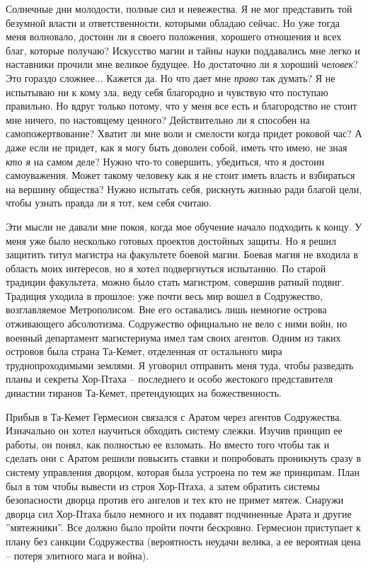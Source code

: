 \documentclass[12pt,a4paper]{article}
\begin{document}
Солнечные дни молодости, полные сил и невежества. Я не мог представить той безумной власти и ответственности, которыми обладаю сейчас.
Но уже тогда меня волновало, достоин ли я своего положения, хорошего отношения и всех благ, которые получаю?
Искусство магии и тайны науки поддавались мне легко и наставники прочили мне великое будущее. Но достаточно ли я хороший \textit{человек}? Это гораздо сложнее... Кажется да. Но что дает мне \textit{право} так думать?
Я не испытываю ни к кому зла, веду себя благородно и чувствую что поступаю правильно. Но вдруг только потому, что у меня все есть и благородство не стоит мне ничего, по настоящему ценного?
Действительно ли я способен на самопожертвование?
Хватит ли мне воли и смелости когда придет роковой час?
А даже если не придет, как я могу быть доволен собой, иметь что имею, не зная \textit{кто я} на самом деле?
Нужно что-то совершить, убедиться, что я достоин самоуважения.
Может такому человеку как я не стоит иметь власть и взбираться на вершину общества?
Нужно испытать себя, рискнуть жизнью ради благой цели, чтобы узнать правда ли я тот, кем себя считаю.

Эти мысли не давали мне покоя, когда мое обучение начало подходить к концу. У меня уже было несколько готовых проектов достойных защиты. Но я решил защитить титул магистра на факультете боевой магии. Боевая магия не входила в область моих интересов, но я хотел подвергнуться испытанию.
По старой традиции факультета, можно было стать магистром, совершив ратный подвиг.
Традиция уходила в прошлое: уже почти весь мир вошел в Содружество, возглавляемое Метрополисом. Вне его оставались лишь немногие острова отживающего абсолютизма. Содружество официально не вело с ними войн, но военный департамент магистериума имел там своих агентов. Одним из таких островов была страна Та-Кемет, отделенная от остального мира труднопроходимыми землями. Я уговорил отправить меня туда, чтобы разведать планы и секреты Хор-Птаха -- последнего и особо жестокого представителя династии тиранов Та-Кемет, претендующих на божественность.


Прибыв в Та-Кемет Гермесион связался с Аратом через агентов Содружества. Изначально он хотел научиться обходить систему слежки. Изучив принцип ее работы, он понял, как полностью ее взломать. Но вместо того чтобы так и сделать они с Аратом решили повысить ставки и попробовать проникнуть сразу в систему управления дворцом, которая была устроена по тем же принципам. План был в том чтобы вывести из строя Хор-Птаха, а затем обратить системы безопасности дворца против его ангелов и тех кто не примет мятеж. Снаружи дворца сил Хор-Птаха было немного и их подавят подчиненные Арата и другие ''мятежники''. Все должно было пройти почти бескровно.
Гермесион приступает к плану без санкции Содружества (вероятность неудачи велика, а ее вероятная цена -- потеря элитного мага и война).
\end{document}
